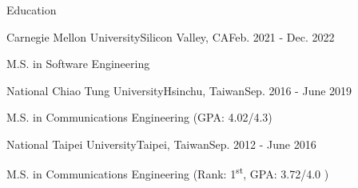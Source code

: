 \documentclass{resume_short} %
\newcommand{\ts}{\textsuperscript}
\begin{document}

\begin{rSection}{Education}
    \begin{rSubsection3}{ Carnegie Mellon University}{Silicon Valley, CA}{Feb. 2021 - Dec. 2022}
        \item {M.S. in Software Engineering}
    \end{rSubsection3}
    \begin{rSubsection3}{ National Chiao Tung University}{Hsinchu, Taiwan}{Sep. 2016 - June 2019}
        \item {M.S. in Communications Engineering (GPA: 4.02/4.3)}
    \end{rSubsection3}
    \begin{rSubsection3}{ National Taipei University}{Taipei, Taiwan}{Sep. 2012 - June 2016}
        \item {M.S. in Communications Engineering (Rank: 1\ts{st}, GPA: 3.72/4.0 )}
    \end{rSubsection3}
\end{rSection}

\end{document}
